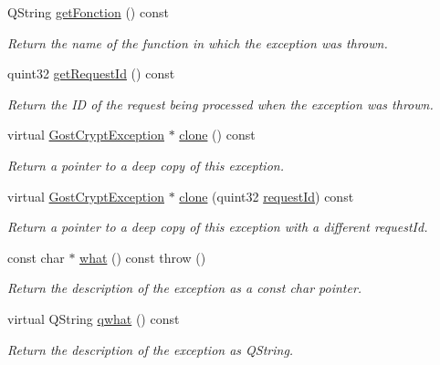 \begin{DoxyCompactItemize}
Q\+String \hyperlink{class_gost_crypt_1_1_gost_crypt_exception_adbb5f1323bb55fc9475a5b7da7ccf2d7}{get\+Fonction} () const
\begin{DoxyCompactList}\small\item\em Return the name of the function in which the exception was thrown. \end{DoxyCompactList}\item 
quint32 \hyperlink{class_gost_crypt_1_1_gost_crypt_exception_a11db61bc33270cb1f19b0d686fadb055}{get\+Request\+Id} () const
\begin{DoxyCompactList}\small\item\em Return the ID of the request being processed when the exception was thrown. \end{DoxyCompactList}\item 
virtual \hyperlink{class_gost_crypt_1_1_gost_crypt_exception}{Gost\+Crypt\+Exception} $\ast$ \hyperlink{class_gost_crypt_1_1_gost_crypt_exception_aba2219d4a03ed5447540ba75e6deda88}{clone} () const
\begin{DoxyCompactList}\small\item\em Return a pointer to a deep copy of this exception. \end{DoxyCompactList}\item 
virtual \hyperlink{class_gost_crypt_1_1_gost_crypt_exception}{Gost\+Crypt\+Exception} $\ast$ \hyperlink{class_gost_crypt_1_1_gost_crypt_exception_aa1b8a52f47d58a06d931f2a30618a380}{clone} (quint32 \hyperlink{class_gost_crypt_1_1_gost_crypt_exception_a7b4217ceb60c944a1ea2d38cd1ecacd0}{request\+Id}) const
\begin{DoxyCompactList}\small\item\em Return a pointer to a deep copy of this exception with a different request\+Id. \end{DoxyCompactList}\item 
const char $\ast$ \hyperlink{class_gost_crypt_1_1_gost_crypt_exception_aa7004879bd9bf6f241d5c9484195b9c9}{what} () const  throw ()
\begin{DoxyCompactList}\small\item\em Return the description of the exception as a const char pointer. \end{DoxyCompactList}\item 
virtual Q\+String \hyperlink{class_gost_crypt_1_1_gost_crypt_exception_a99e923110f90c9b7af990d3bfe97f164}{qwhat} () const
\begin{DoxyCompactList}\small\item\em Return the description of the exception as Q\+String. \end{DoxyCompactList}\item 

\end{DoxyCompactItemize}

